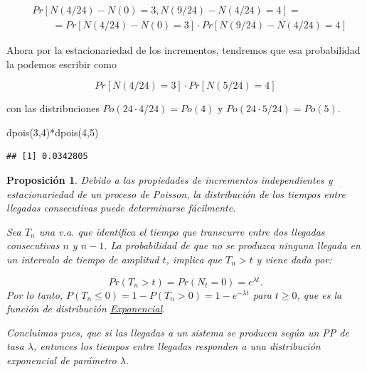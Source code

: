 \documentclass[
]{book}
\newenvironment{Shaded}{\begin{snugshade}}{\end{snugshade}}
\newcommand{\DecValTok}[1]{\textcolor[rgb]{0.00,0.00,0.81}{#1}}
\newcommand{\FunctionTok}[1]{\textcolor[rgb]{0.00,0.00,0.00}{#1}}
\newcommand{\NormalTok}[1]{#1}
\newcommand{\SpecialCharTok}[1]{\textcolor[rgb]{0.00,0.00,0.00}{#1}}
\newtheorem{proposition}{Proposición}[chapter]
\theoremstyle{definition}
\theoremstyle{definition}
\theoremstyle{definition}
\theoremstyle{definition}
\theoremstyle{remark}
\begin{document}
\begin{eqnarray*}
& Pr[N(4/24)-N(0)=3, N(9/24)-N(4/24)=4]= \\
& \qquad = Pr[N(4/24)-N(0)=3] \cdot Pr[N(9/24)-N(4/24)=4]
\end{eqnarray*}

Ahora por la estacionariedad de los incrementos, tendremos que esa probabilidad la podemos escribir como

\[Pr[N(4/24)=3]\cdot Pr[N(5/24)=4]\]

con las distribuciones \(Po(24 \cdot 4/24)=Po(4)\) y \(Po(24 \cdot 5/24)=Po(5)\).

\begin{Shaded}
\begin{Highlighting}[]
\FunctionTok{dpois}\NormalTok{(}\DecValTok{3}\NormalTok{,}\DecValTok{4}\NormalTok{)}\SpecialCharTok{*}\FunctionTok{dpois}\NormalTok{(}\DecValTok{4}\NormalTok{,}\DecValTok{5}\NormalTok{)}
\end{Highlighting}
\end{Shaded}

\begin{verbatim}
## [1] 0.0342805
\end{verbatim}

\begin{proposition}
Debido a las propiedades de incrementos independientes y estacionariedad de un proceso de Poisson, la distribución de los tiempos entre llegadas consecutivas puede determinarse fácilmente.

Sea \(T_n\) una v.a. que identifica el tiempo que transcurre entre dos llegadas consecutivas \(n\) y \(n-1\). La probabilidad de que no se produzca ninguna llegada en un intervalo de tiempo de amplitud \(t\), implica que \(T_n>t\) y viene dada por:

\[Pr(T_n > t)=Pr(N_t = 0) = e^{\lambda t}.\] Por lo tanto, \(P(T_n \leq 0) = 1 - P(T_n > 0) = 1 - e^{-\lambda t}\) para \(t ≥ 0\), que es la función de distribución \protect\hyperlink{exponencial}{Exponencial}.

Concluimos pues, que si las llegadas a un sistema se producen según un PP de tasa \(\lambda\), entonces los tiempos entre llegadas responden a una distribución exponencial de parámetro \(\lambda\).
\end{proposition}
\end{document}
